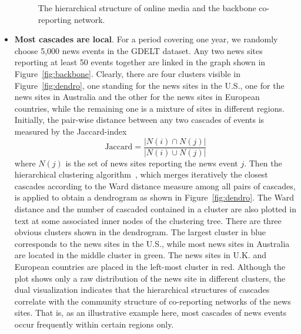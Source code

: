 \begin{itemize}
\begin{figure}[t!]
\caption{The hierarchical structure of online media and the backbone co-reporting network.}
\end{figure}

\item \textbf{Most cascades are local}. 
For a period covering one year, we randomly choose 5,000 news events in the GDELT dataset. Any two news sites reporting at least 50 events together are linked in the graph shown in Figure~\ref{fig:backbone}. Clearly, there are four clusters visible in Figure~\ref{fig:dendro}, one standing for the news sites in the U.S., one for the news sites in Australia and the other for the news sites in European countries, while the remaining one is a mixture of sites in different regions. Initially, the pair-wise distance between any two cascades of events is measured by the Jaccard-index
\begin{equation}
    \text{Jaccard} = \frac{|N(i)\cap N(j)|}{|N(i)\cup N(j)|}
\end{equation}
where $N(j)$ is the set of news sites reporting the news event $j$. Then the hierarchical clustering algorithm~\cite{johnson1967hierarchical}, which merges iteratively the closest cascades according to the Ward distance measure among all pairs of cascades, is applied to obtain a dendrogram as shown in Figure~\ref{fig:dendro}. The Ward distance and the number of cascaded contained in a cluster are also plotted in text at some associated inner nodes of the clustering tree. There are three obvious clusters shown in the dendrogram. The largest cluster in blue corresponds to the news sites in the U.S., while most news sites in Australia are located in the middle cluster in green. The news sites in U.K. and European countries are placed in the left-most cluster in red. Although the plot shows only a raw distribution of the news site in different clusters, the dual visualization indicates that the hierarchical structures of cascades correlate with the community structure of co-reporting networks of the news sites. That is, as an illustrative example here, most cascades of news events occur frequently within certain regions only.


\end{itemize}
